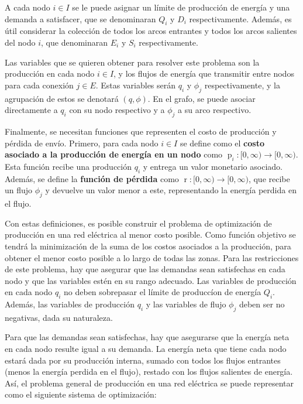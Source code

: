 \documentclass[12pt,twoside]{article}
\begin{document}
	\hspace{1cm} A cada nodo \(i\in I\) se le puede asignar un l\'imite de producci\'on de energ\'ia y una demanda a satisfacer, que se denominaran \(Q_i\) y \(D_i\) respectivamente. Adem\'as, es \'util considerar la colecci\'on de todos los arcos entrantes y todos los arcos salientes del nodo \(i\), que denominaran \(E_i\) y \(S_i\) respectivamente.
	
	\hspace{1cm} Las variables que se quieren obtener para resolver este problema son la producci\'on en cada nodo \(i\in I\), y los flujos de energ\'ia que transmitir entre nodos para cada conexi\'on \(j\in E\). Estas variables ser\'an \(q_i\) y \(\phi_j\) respectivamente, y la agrupaci\'on de estos se denotar\'a \((q,\phi)\). En el grafo, se puede asociar directamente a \(q_i\) con su nodo respectivo y a \(\phi_j\) a su arco respectivo.
	
	\hspace{1cm} Finalmente, se necesitan funciones que representen el costo de producci\'on y p\'erdida de env\'io. Primero, para cada nodo \(i\in I\) se define como el \textbf{costo asociado a la producci\'on de energ\'ia en un nodo} como \(\operatorname{p}_i:[0,\infty)\to[0,\infty)\). Esta funci\'on recibe una producci\'on \(q_i\) y entrega un valor monetario asociado. Adem\'as, se define la \textbf{funci\'on de p\'erdida} como \(\operatorname{r}:[0,\infty)\to[0,\infty)\), que recibe un flujo \(\phi_j\) y devuelve un valor menor a este, representando la energ\'ia perdida en el flujo.
	
	\hspace{1cm} Con estas definiciones, es posible construir el problema de optimizaci\'on de producci\'on en una red el\'ectrica al menor costo posible. Como funci\'on objetivo se tendr\'a la minimizaci\'on de la suma de los costos asociados a la producci\'on, para obtener el menor costo posible a lo largo de todas las zonas. Para las restricciones de este problema, hay que asegurar que las demandas sean satisfechas en cada nodo y que las variables est\'en en su rango adecuado. Las variables de producci\'on en cada nodo \(q_i\) no deben sobrepasar el l\'imite de producc\'ion de energ\'ia \(Q_i\). Adem\'as, las variables de producci\'on \(q_i\) y las variables de flujo \(\phi_j\) deben ser no negativas, dada su naturaleza.
	
	\hspace{1cm} Para que las demandas sean satisfechas, hay que asegurarse que la energ\'ia neta en cada nodo resulte igual a su demanda. La energ\'ia neta que tiene cada nodo estar\'a dada por su producci\'on interna, sumado con todos los flujos entrantes (menos la energ\'ia perdida en el flujo), restado con los flujos salientes de energ\'ia. As\'i, el problema general de producci\'on en una red el\'ectrica se puede representar como el siguiente sistema de optimizaci\'on:
	
\end{document}
